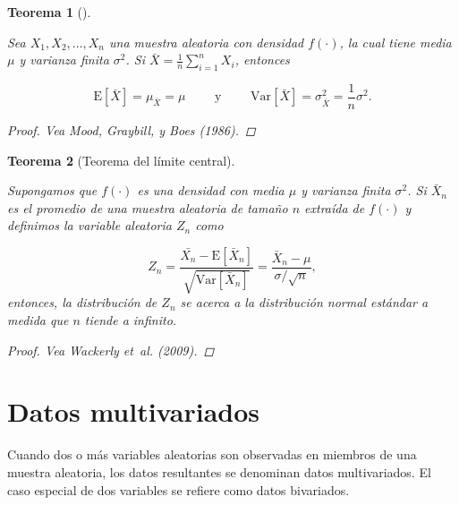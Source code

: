 \documentclass[
  us-letterpaper,
]{scrreprt}
\theoremstyle{plain}
\theoremstyle{definition}
\theoremstyle{definition}
\theoremstyle{plain}
\newtheorem{theorem}{Teorema}[chapter]
\theoremstyle{remark}
\begin{document}
\begin{theorem}[]\protect\hypertarget{thm-meanvar}{}\label{thm-meanvar}

Sea \(X_1, X_2, \ldots, X_n\) una muestra aleatoria con densidad
\(f(\cdot)\), la cual tiene media \(\mu\) y varianza finita
\(\sigma^2\). Si \(\bar{X} = \frac{1}{n}\sum\limits_{i=1}^n X_i\),
entonces

\[ \mathrm{E}[\bar X]=\mu_{\bar X}=\mu\qquad \text{ y }\qquad \mathrm{Var}[\bar X]=\sigma_{\bar X}^2 =\frac{1}{n}\sigma^2.\]

\begin{proof}
Vea Mood, Graybill, y Boes (1986).
\end{proof}

\end{theorem}

\begin{theorem}[Teorema del límite
central]\protect\hypertarget{thm-TCL}{}\label{thm-TCL}

Supongamos que \(f(\cdot)\) es una densidad con media \(\mu\) y varianza
finita \(\sigma^2\). Si \(\bar{X}_n\) es el promedio de una muestra
aleatoria de tamaño \(n\) extraída de \(f(\cdot)\) y definimos la
variable aleatoria \(Z_n\) como

\[ Z_n = \frac{\bar{X_n}-\mathrm E[\bar X_n]}{\sqrt{\mathrm{Var}[\bar X_n]}}=\frac{\bar X_n-\mu}{\sigma/\sqrt n},\]
entonces, la distribución de \(Z_n\) se acerca a la distribución normal
estándar a medida que \(n\) tiende a infinito.

\begin{proof}
Vea Wackerly et~al. (2009).
\end{proof}

\end{theorem}

\section{Datos multivariados}\label{datos-multivariados}

Cuando dos o más variables aleatorias son observadas en miembros de una
muestra aleatoria, los datos resultantes se denominan datos
multivariados. El caso especial de dos variables se refiere como datos
bivariados.
\end{document}
